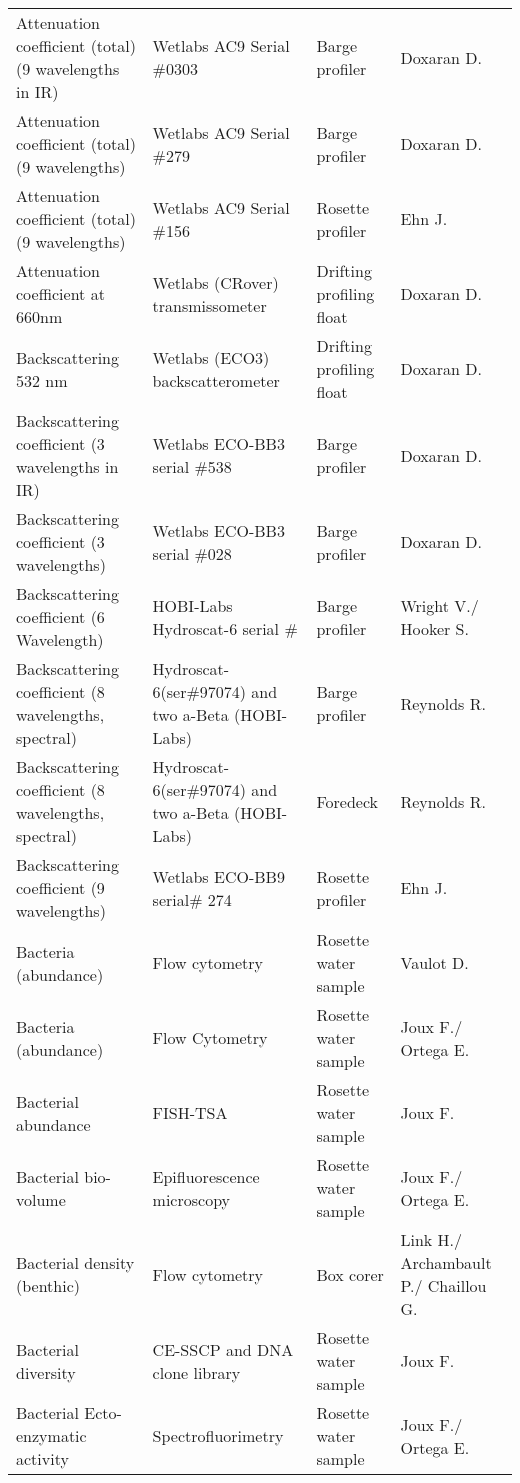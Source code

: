 \begin{landscape}
\begin{longtable}[t]{llll}
Attenuation coefficient (total)(9 wavelengths in IR) & Wetlabs AC9 Serial \#0303 & Barge profiler & Doxaran D.\\
Attenuation coefficient (total)(9 wavelengths) & Wetlabs AC9 Serial \#279 & Barge profiler & Doxaran D.\\
Attenuation coefficient (total)(9 wavelengths) & Wetlabs AC9 Serial \#156 & Rosette profiler & Ehn J.\\
Attenuation coefficient at 660nm & Wetlabs (CRover) transmissometer & Drifting profiling float & Doxaran D.\\
\addlinespace
Backscattering 532 nm & Wetlabs (ECO3) backscatterometer & Drifting profiling float & Doxaran D.\\
Backscattering coefficient (3 wavelengths in IR) & Wetlabs ECO-BB3 serial \#538 & Barge profiler & Doxaran D.\\
Backscattering coefficient (3 wavelengths) & Wetlabs ECO-BB3 serial \#028 & Barge profiler & Doxaran D.\\
Backscattering coefficient (6 Wavelength) & HOBI-Labs Hydroscat-6 serial \# & Barge profiler & Wright V./ Hooker S.\\
Backscattering coefficient (8 wavelengths, spectral) & Hydroscat-6(ser\#97074) and two a-Beta (HOBI-Labs) & Barge profiler & Reynolds R.\\
\addlinespace
Backscattering coefficient (8 wavelengths, spectral) & Hydroscat-6(ser\#97074) and two a-Beta (HOBI-Labs) & Foredeck & Reynolds R.\\
Backscattering coefficient (9 wavelengths) & Wetlabs ECO-BB9 serial\# 274 & Rosette profiler & Ehn J.\\
Bacteria (abundance) & Flow cytometry & Rosette water sample & Vaulot D.\\
Bacteria (abundance) & Flow Cytometry & Rosette water sample & Joux F./ Ortega E.\\
Bacterial abundance & FISH-TSA & Rosette water sample & Joux F.\\
\addlinespace
Bacterial bio-volume & Epifluorescence microscopy & Rosette water sample & Joux F./ Ortega E.\\
Bacterial density (benthic) & Flow cytometry & Box corer & Link H./ Archambault P./ Chaillou G.\\
Bacterial diversity & CE-SSCP and DNA clone library & Rosette water sample & Joux F.\\
Bacterial Ecto-enzymatic activity & Spectrofluorimetry & Rosette water sample & Joux F./ Ortega E.\\

\end{longtable}
\end{landscape}
